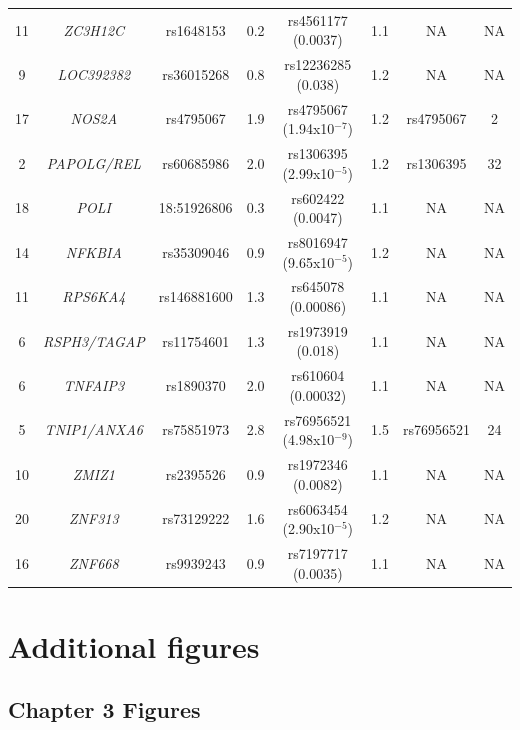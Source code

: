 \begin{landscape}
\begin{center}
\begin{longtable}[ht]{c c c c c c c c}
11 & \textit{ZC3H12C}	&rs1648153&	0.2	&rs4561177 (0.0037) &	1.1 &NA &	NA \\
9	 & \textit{LOC392382}	    &rs36015268&	0.8 	&	rs12236285 (0.038)  & 1.2 &NA	& NA \\
17 & \textit{NOS2A}	        &rs4795067&	1.9   & rs4795067 (1.94x10$^{-7}$) &1.2	& rs4795067 &	2 \\
2	 & \textit{PAPOLG/REL}	  &rs60685986&	2.0   & rs1306395 (2.99x10$^{-5}$) &1.2	&rs1306395	& 32 \\
18 & \textit{POLI}	       &18:51926806&	0.3   & rs602422 (0.0047)	& 1.1 & NA &	NA \\
14 & \textit{NFKBIA}	       &rs35309046&	0.9  	& rs8016947 (9.65x10$^{-5}$) & 1.2 &	NA &	NA \\
11 & \textit{RPS6KA4}	     &rs146881600&	1.3 	& rs645078 (0.00086) &1.1	&NA	& NA \\
6	 & \textit{RSPH3/TAGAP}	 &rs11754601&	1.3   & rs1973919 (0.018)	&	1.1 &NA	& NA \\
6	 & \textit{TNFAIP3}	     &rs1890370&	2.0 	 & rs610604 (0.00032) &1.1	& NA	& NA \\
5	 & \textit{TNIP1/ANXA6}	 &rs75851973&	2.8 	 & rs76956521 (4.98x10$^{-9}$) &1.5 &	rs76956521	& 24 \\
10 & \textit{ZMIZ1}	       &rs2395526&	0.9   & rs1972346 (0.0082)	& 1.1& NA &	NA \\
20 & \textit{ZNF313}	     &rs73129222&	1.6	 & rs6063454 (2.90x10$^{-5}$) & 1.2 & NA & 	NA \\
16 & \textit{ZNF668}       &rs9939243 &	0.9	 & rs7197717 (0.0035) &	1.1 &NA 	& NA \\
\bottomrule
\end{longtable}
\end{center}
\end{landscape}

\clearpage



\chapter{Additional figures}
\label{app:Figures}

\section{Chapter 3 Figures}

